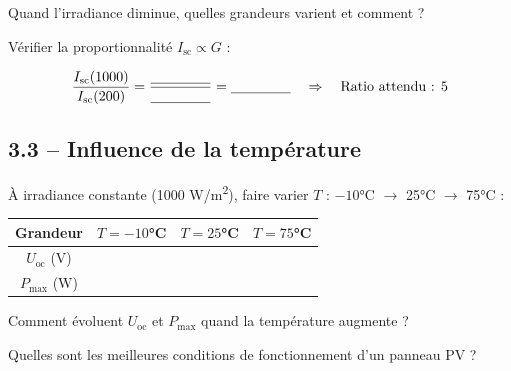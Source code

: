 \documentclass[a4paper, 11pt, oneside]{article}
\begin{document}
\vspace{0.6cm}

Quand l'irradiance diminue, quelles grandeurs varient et comment ?

\vspace{1cm}

Vérifier la proportionnalité $I_{\text{sc}} \propto G$ :

\[
\frac{I_{\text{sc}}(1000)}{I_{\text{sc}}(200)} = \frac{\underline{\hspace{1.5cm}}}{\underline{\hspace{1.5cm}}} = \underline{\hspace{1.5cm}} \quad \Rightarrow \quad \text{Ratio attendu : 5}
\]

\vspace{0.8cm}

\subsection*{3.3 -- Influence de la température}

\begin{tcolorbox}[colback=teal!10, colframe=teal]
À irradiance constante (1000 W/m\textsuperscript{2}), faire varier $T$ : $-10$°C $\rightarrow$ 25°C $\rightarrow$ 75°C :

\vspace{0.4cm}
\begin{tabular}{|c|c|c|c|}
\hline
\textbf{Grandeur} & $T = -10$°C & $T = 25$°C & $T = 75$°C \\
\hline
$U_{\text{oc}}$ (V) & \underline{\hspace{2cm}} & \underline{\hspace{2cm}} & \underline{\hspace{2cm}} \\[8pt]
\hline
$P_{\max}$ (W) & \underline{\hspace{2cm}} & \underline{\hspace{2cm}} & \underline{\hspace{2cm}} \\[8pt]
\hline
\end{tabular}
\end{tcolorbox}

\vspace{0.6cm}

Comment évoluent $U_{\text{oc}}$ et $P_{\max}$ quand la température augmente ?

\vspace{1.2cm}

Quelles sont les meilleures conditions de fonctionnement d'un panneau PV ?
\end{document}
